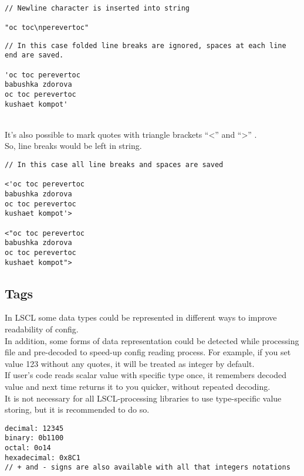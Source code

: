 ~\\
\begin{minipage}{0.45\textwidth}
\begin{lstlisting}[caption = double-quoted style]
// Newline character is inserted into string

"oc toc\nperevertoc"
\end{lstlisting}
\end{minipage}
\hfill
\begin{minipage}{0.45\textwidth}
\begin{lstlisting}[caption = multiline scalar]
// In this case folded line breaks are ignored, spaces at each line end are saved.

'oc toc perevertoc
babushka zdorova
oc toc perevertoc
kushaet kompot'
\end{lstlisting}
\end{minipage}
~\\
It's also possible to mark quotes with triangle brackets ``<'' and ``>'' .\\
So, line breaks would be left in string.
\begin{lstlisting}[caption = multiline scalar with linebreaks]
// In this case all line breaks and spaces are saved

<'oc toc perevertoc
babushka zdorova
oc toc perevertoc
kushaet kompot'>

<"oc toc perevertoc
babushka zdorova
oc toc perevertoc
kushaet kompot">
\end{lstlisting}

\subsection{Tags}
In LSCL some data types could be represented in different ways to improve readability of config. \\
In addition, some forms of data representation could be detected while processing file and pre-decoded to speed-up config reading process. For example, if you set value 123 without any quotes, it will be treated as integer by default. \\
If user's code reads scalar value with specific type once, it remembers decoded value and next time returns it to you quicker, without repeated decoding. \\
It is not necessary for all LSCL-processing libraries to use type-specific value storing, but it is recommended to do so.
\begin{lstlisting}[caption = integers]
decimal: 12345
binary: 0b1100
octal: 0o14
hexadecimal: 0x8C1
// + and - signs are also available with all that integers notations
\end{lstlisting}


